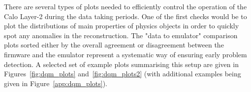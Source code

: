 \hspace{10pt} There are several types of plots needed to efficiently control the operation of the Calo Layer-2 during the data taking periods. One of the first checks would be to plot the distributions of main properties of physics objects in order to quickly spot any anomalies in the reconstruction. The "data to emulator" comparison plots sorted either by the overall agreement or disagreement between the firmware and the emulator represent a systematic way of ensuring early problem detection.  A selected set of example plots summarising this setup are given in Figures~\ref{fig:dqm_plots} and~\ref{fig:dqm_plots2} (with additional examples being given in Figure~\ref{app:dqm_plots}).
\begin{figure}[htbp]
  \centering
    \\
\end{figure}
